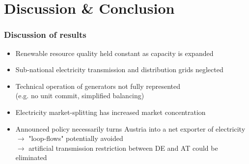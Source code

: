 \documentclass[aspectratio=1610, xcolor=dvipsnames,handout]{beamer} %
\begin{document}
    \section{Discussion \& Conclusion}
    \begin{frame}
        \frametitle{Discussion of results}
        \begin{itemize}
            \item Renewable resource quality held constant as capacity is expanded
            \item Sub-national electricity transmission and distribution grids neglected
            \item Technical operation of generators not fully represented \\(e.g. no unit commit, simplified balancing)
            \item Electricity market-splitting has increased market concentration
            \item Announced policy necessarily turns Austria into a net exporter of electricity\\
            $\rightarrow$ "loop-flows" potentially avoided \\
            $\rightarrow$ artificial transmission restriction between DE and AT could be eliminated
        \end{itemize}
    \end{frame}
\end{document}

